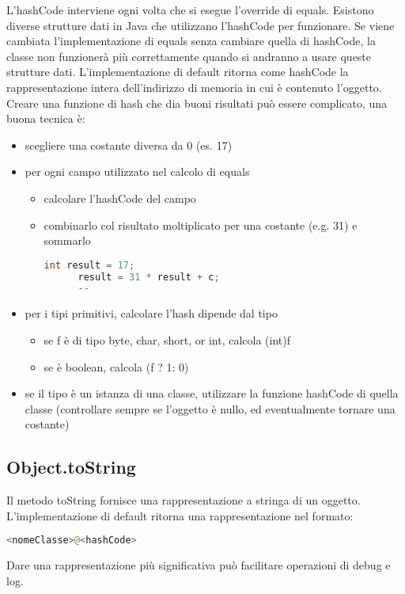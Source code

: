 \documentclass[a4paper,12pt,twoside]{book}
\begin{document}
L'hashCode interviene ogni volta che si esegue l'override di
equals. Esistono diverse strutture dati in Java che utilizzano
l'hashCode per funzionare. Se viene cambiata l'implementazione di
equals senza cambiare quella di hashCode, la classe non funzionerà più
correttamente quando si andranno a usare queste strutture
dati. L’implementazione di default ritorna come hashCode la
rappresentazione intera dell’indirizzo di memoria in cui è contenuto
l’oggetto.
Creare una funzione di hash che dia buoni risultati può essere
complicato, una buona tecnica è:
\begin{itemize}
\item scegliere una costante diversa da 0 (es. 17)
\item per ogni campo utilizzato nel calcolo di equals
  \begin{itemize}
  \item calcolare l’hashCode del campo
  \item combinarlo col risultato moltiplicato per una costante (e.g. 31) e
    sommarlo
    \begin{lstlisting}[caption={},
      label={lst:hashCode},language=Java]
      int result = 17;
      result = 31 * result + c;
      --
    \end{lstlisting}
  \end{itemize}
\item per i tipi primitivi, calcolare l’hash dipende dal tipo
  \begin{itemize}
  \item se f è di tipo byte, char, short, or int, calcola (int)f
  \item se è boolean, calcola (f ? 1: 0)
  \end{itemize}
\item se il tipo è un istanza di una classe, utilizzare la funzione
  hashCode di quella classe (controllare sempre se l’oggetto è nullo,
  ed eventualmente tornare una costante)
\end{itemize} 

\subsection{Object.toString}
Il metodo toString fornisce una rappresentazione a stringa di un
oggetto. L’implementazione di default ritorna una rappresentazione nel
formato:
\begin{lstlisting}[xleftmargin=0.3\textwidth, xrightmargin=0.3\textwidth, language=Java]
  <nomeClasse>@<hashCode>
\end{lstlisting}
Dare una rappresentazione più significativa può facilitare operazioni
di debug e log.
\end{document}
